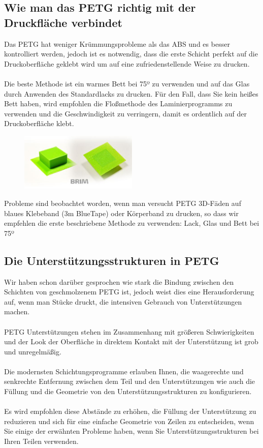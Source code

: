\documentclass[11pt,a4paper]{article}
\begin{document}
	\subsection{Wie man das PETG richtig mit der Druckfläche verbindet}Das PETG hat weniger Krümmungsprobleme als das ABS und es besser kontrolliert werden, jedoch ist es notwendig, dass die erste Schicht perfekt auf die Druckoberfläche geklebt wird um auf eine zufriedenstellende Weise zu drucken.
\\\\
Die beste Methode ist ein warmes Bett bei 75º zu verwenden und auf das Glas durch Anwenden des Standardlacks zu drucken. Für den Fall, dass Sie kein heißes Bett haben, wird empfohlen die Floßmethode des Laminierprogramms zu verwenden und die Geschwindigkeit zu verringern, damit es ordentlich auf der Druckoberfläche klebt.
\begin{figure}[H]
\centering
\includegraphics[width=0.5\textwidth,cfbox=azul_marcos 1pt 0pt]{FOTOS/BRIM}
\end{figure}
Probleme sind beobachtet worden, wenn man versucht PETG 3D-Fäden auf blaues Klebeband (3m BlueTape) oder Körperband zu drucken, so dass wir empfehlen die erste beschriebene Methode zu verwenden: Lack, Glas und Bett bei 75º
	\subsection{Die Unterstützungsstrukturen in PETG}Wir haben schon darüber gesprochen wie stark die Bindung zwischen den Schichten von geschmolzenem PETG ist, jedoch weist dies eine Herausforderung auf, wenn man Stücke druckt, die intensiven Gebrauch von Unterstützungen machen.
\\\\
PETG Unterstützungen stehen im Zusammenhang mit größeren Schwierigkeiten und der Look der Oberfläche in direktem Kontakt mit der Unterstützung ist grob und unregelmäßig.
\\\\
Die modernsten Schichtungsprogramme erlauben Ihnen, die waagerechte und senkrechte Entfernung zwischen dem Teil und den Unterstützungen wie auch die Füllung und die Geometrie von den Unterstützungsstrukturen zu konfigurieren.
\\\\
Es wird empfohlen diese Abstände zu erhöhen, die Füllung der Unterstützung zu reduzieren und sich für eine einfache Geometrie von Zeilen zu entscheiden, wenn Sie einige der erwähnten Probleme haben, wenn Sie Unterstützungsstrukturen bei Ihren Teilen verwenden.
\end{document}
